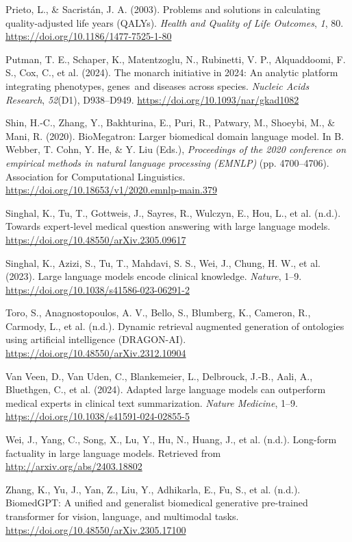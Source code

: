 \documentclass[
]{agujournal2019}
\newlength{\cslhangindent}
\newenvironment{CSLReferences}[2] %
 {\begin{list}{}{%
  \setlength{\itemindent}{0pt}
  \setlength{\leftmargin}{0pt}
  \setlength{\parsep}{0pt}
  \ifodd #1
   \setlength{\leftmargin}{\cslhangindent}
   \setlength{\itemindent}{-1\cslhangindent}
  \fi
  \setlength{\itemsep}{#2\baselineskip}}}
 {\end{list}}
\begin{document}
\begin{CSLReferences}{1}{0}
Prieto, L., \& Sacristán, J. A. (2003). Problems and solutions in
calculating quality-adjusted life years (QALYs). \emph{Health and
Quality of Life Outcomes}, \emph{1}, 80.
\url{https://doi.org/10.1186/1477-7525-1-80}

Putman, T. E., Schaper, K., Matentzoglu, N., Rubinetti, V. P.,
Alquaddoomi, F. S., Cox, C., et al. (2024). The monarch initiative in
2024: An analytic platform integrating phenotypes, genes~and diseases
across species. \emph{Nucleic Acids Research}, \emph{52}(D1),
D938--D949. \url{https://doi.org/10.1093/nar/gkad1082}

Shin, H.-C., Zhang, Y., Bakhturina, E., Puri, R., Patwary, M., Shoeybi,
M., \& Mani, R. (2020). BioMegatron: Larger biomedical domain language
model. In B. Webber, T. Cohn, Y. He, \& Y. Liu (Eds.), \emph{Proceedings
of the 2020 conference on empirical methods in natural language
processing (EMNLP)} (pp. 4700--4706). Association for Computational
Linguistics. \url{https://doi.org/10.18653/v1/2020.emnlp-main.379}

Singhal, K., Tu, T., Gottweis, J., Sayres, R., Wulczyn, E., Hou, L., et
al. (n.d.). Towards expert-level medical question answering with large
language models. \url{https://doi.org/10.48550/arXiv.2305.09617}

Singhal, K., Azizi, S., Tu, T., Mahdavi, S. S., Wei, J., Chung, H. W.,
et al. (2023). Large language models encode clinical knowledge.
\emph{Nature}, 1--9. \url{https://doi.org/10.1038/s41586-023-06291-2}

Toro, S., Anagnostopoulos, A. V., Bello, S., Blumberg, K., Cameron, R.,
Carmody, L., et al. (n.d.). Dynamic retrieval augmented generation of
ontologies using artificial intelligence (DRAGON-AI).
\url{https://doi.org/10.48550/arXiv.2312.10904}

Van Veen, D., Van Uden, C., Blankemeier, L., Delbrouck, J.-B., Aali, A.,
Bluethgen, C., et al. (2024). Adapted large language models can
outperform medical experts in clinical text summarization. \emph{Nature
Medicine}, 1--9. \url{https://doi.org/10.1038/s41591-024-02855-5}

Wei, J., Yang, C., Song, X., Lu, Y., Hu, N., Huang, J., et al. (n.d.).
Long-form factuality in large language models. Retrieved from
\url{http://arxiv.org/abs/2403.18802}

Zhang, K., Yu, J., Yan, Z., Liu, Y., Adhikarla, E., Fu, S., et al.
(n.d.). BiomedGPT: A unified and generalist biomedical generative
pre-trained transformer for vision, language, and multimodal tasks.
\url{https://doi.org/10.48550/arXiv.2305.17100}

\end{CSLReferences}
\end{document}
